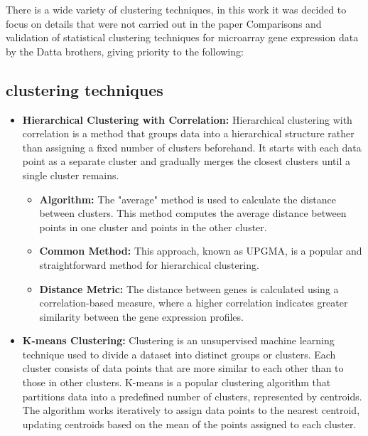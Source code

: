\documentclass{llncs}
\begin{document}
There is a wide variety of clustering techniques, in this work it was decided to focus on details that were not carried out in the paper Comparisons and validation of statistical
clustering techniques for microarray gene
expression data by the Datta brothers, giving priority to the following:
\subsection{clustering techniques}


\begin{itemize}
	\item \textbf{Hierarchical Clustering with Correlation:} Hierarchical clustering with correlation is a method that groups data into a hierarchical structure rather than assigning a fixed number of clusters beforehand. It starts with each data point as a separate cluster and gradually merges the closest clusters until a single cluster remains.\cite{guess2002}
	
	\begin{itemize}
		\item \textbf{Algorithm:} The "average" method is used to calculate the distance between clusters. This method computes the average distance between points in one cluster and points in the other cluster.\cite{datta2003}
		
		\item \textbf{Common Method:} This approach, known as UPGMA, is a popular and straightforward method for hierarchical clustering.\cite{datta2003}
		
		\item \textbf{Distance Metric:} The distance between genes is calculated using a correlation-based measure, where a higher correlation indicates greater similarity between the gene expression profiles.\cite{datta2003}
	\end{itemize}
	
	
		
		\item \textbf{K-means Clustering:} Clustering is an unsupervised machine learning technique used to divide a dataset into distinct groups or clusters. Each cluster consists of data points that are more similar to each other than to those in other clusters. K-means is a popular clustering algorithm that partitions data into a predefined number of clusters, represented by centroids. The algorithm works iteratively to assign data points to the nearest centroid, updating centroids based on the mean of the points assigned to each cluster.\cite{steinley2006}
		

\end{itemize}
\end{document}
